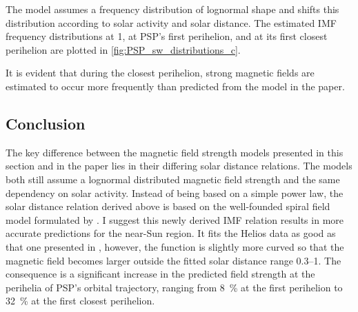 The model assumes a frequency distribution of lognormal shape and shifts this distribution according to solar activity and solar distance. The estimated IMF frequency distributions at \SI{1}{\au}, at PSP's first perihelion, and at its first closest perihelion are plotted in \autoref{fig:PSP_sw_distributions_c}.
\begin{figure}[htb]
\end{figure}
It is evident that during the closest perihelion, strong magnetic fields are estimated to occur more frequently than predicted from the model in the paper.

\subsection{Conclusion}
The key difference between the magnetic field strength models presented in this section and in the paper lies in their differing solar distance relations. The models both still assume a lognormal distributed magnetic field strength and the same dependency on solar activity. Instead of being based on a simple power law, the solar distance relation derived above is based on the well-founded spiral field model formulated by \citet{Parker1958}. I suggest this newly derived IMF relation results in more accurate predictions for the near-Sun region. It fits the Helios data as good as that one presented in \citet{Venzmer2018}, however, the function is slightly more curved so that the magnetic field becomes larger outside the fitted solar distance range \SIrange{0.3}{1}{\au}. The consequence is a significant increase in the predicted field strength at the perihelia of PSP's orbital trajectory, ranging from \SI{8}{\%} at the first perihelion to \SI{32}{\%} at the first closest perihelion.


